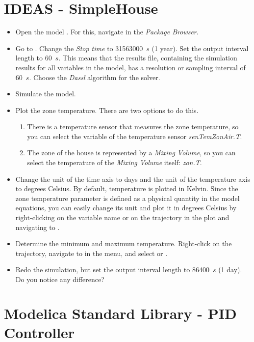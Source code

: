 \documentclass[10pt,a4paper]{article}
\begin{document}
\newpage

\section{IDEAS - SimpleHouse}

\begin{itemize}
	\item Open the model . For this, navigate in the \textit{Package Browser}.
	\item Go to . Change the \textit{Stop time} to 31563000~$s$ (1 year). Set the output interval length to 60~$s$. This means that the results file, containing the simulation results for all variables in the model, has a resolution or sampling interval of 60~$s$. Choose the \textit{Dassl} algorithm for the solver.
	\item Simulate the model.
	\item Plot the zone temperature. There are two options to do this. 
	\begin{enumerate}
		\item There is a temperature sensor that measures the zone temperature, so you can select the variable of the temperature sensor \textit{senTemZonAir.T}.
		\item The zone of the house is represented by a \textit{Mixing Volume}, so you can select the temperature of the \textit{Mixing Volume} itself: \textit{zon.T}.
	\end{enumerate}
	\item Change the unit of the time axis to days and the unit of the temperature axis to degrees Celsius. By default, temperature is plotted in Kelvin. Since the zone temperature parameter is defined as a physical quantity in the model equations, you can easily change its unit and plot it in degrees Celsius by right-clicking on the variable name or on the trajectory in the plot and navigating to  .
	\item Determine the minimum and maximum temperature. Right-click on the trajectory, navigate to   in the menu, and select  or .
	\item Redo the simulation, but set the output interval length to 86400~$s$ (1 day). Do you notice any difference?
\end{itemize}

\section{Modelica Standard Library - PID Controller}
\end{document}
